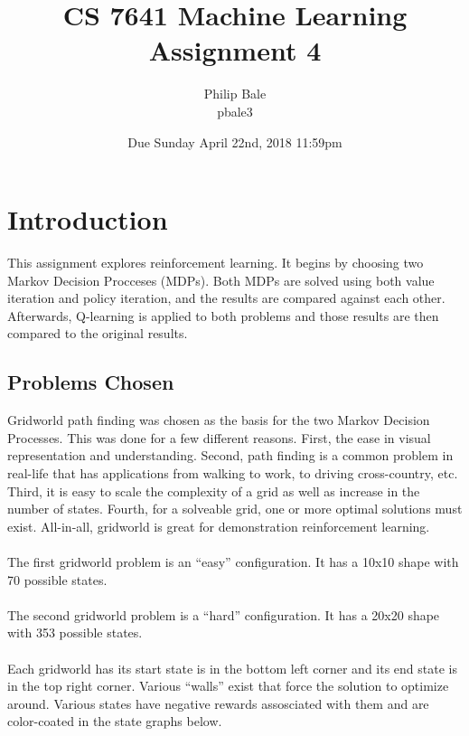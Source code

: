 \documentclass[h]{article}
\title{CS 7641 Machine Learning \\ Assignment 4}
\date{Due Sunday April 22nd, 2018 11:59pm}
\author{Philip Bale \\ pbale3}
\begin{document}
\maketitle

\section*{Introduction}  
This assignment explores reinforcement learning.  It begins by choosing two 
Markov Decision Procceses (MDPs).  Both MDPs are solved using both value 
iteration and policy iteration, and the results are compared against each other. 
 Afterwards, Q-learning is applied to both problems and those results are then 
 compared to the original results.
 
\subsection*{Problems Chosen}
Gridworld path finding was chosen as the basis for the two Markov Decision Processes.  This 
was done for a few different reasons.  First, the ease in visual representation 
and understanding.  Second, path finding is a common problem in real-life that 
has applications from walking to work, to driving cross-country, etc.  Third, it 
is easy to scale the complexity of a grid as well as increase in the number of 
states.  Fourth, for a solveable grid, one or more optimal solutions must exist. 
 All-in-all, gridworld is great for demonstration reinforcement learning.
 \\ \\ %
 The first gridworld problem is an ``easy'' configuration.  It has a 10x10 
 shape with 70 possible states.
 \\ \\ 
 The second gridworld problem is a ``hard'' configuration.  It has a 20x20 
 shape with 353 possible states.  
 \\ \\
 Each gridworld has its start state is in the bottom left corner and 
 its end state is in the top right corner.  Various ``walls'' exist that force 
 the solution to optimize around.  Various states have negative rewards 
 assosciated with them and are color-coated in the state graphs below.
 
\end{document}
